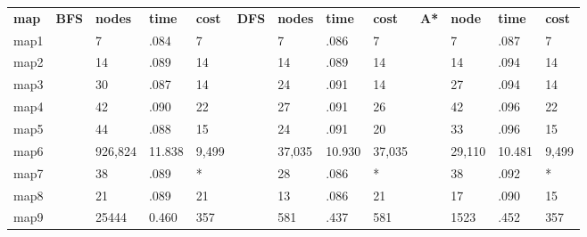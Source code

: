\documentclass[12pt]{article}
\newcommand{\n}{\vspace{5mm}}
\newenvironment{questionList}{
\newcounter{ctr}
\begin{list}{\textbf{Question \arabic{ctr}.} \\ \\ }
  {\usecounter{ctr}}
  }{
\end{list}
}
\begin{document}
\begin{questionList}
\n\noindent
\begin{table}[h]
\begin{tabular}{lllllllllllll}
\textbf{map} & \textbf{BFS} & \textbf{nodes} & \textbf{time} & \textbf{cost} & \textbf{DFS} & \textbf{nodes} & \textbf{time} & \textbf{cost} & \textbf{A*} & \textbf{node} & \textbf{time} & \textbf{cost} \\
map1         &              & 7              & .084          & 7             &              & 7              & .086          & 7             &             & 7             & .087          & 7             \\
map2         &              & 14             & .089          & 14            &              & 14             & .089          & 14            &             & 14            & .094          & 14            \\
map3         &              & 30             & .087          & 14            &              & 24             & .091          & 14            &             & 27            & .094          & 14            \\
map4         &              & 42             & .090          & 22            &              & 27             & .091          & 26            &             & 42            & .096          & 22            \\
map5         &              & 44             & .088          & 15            &              & 24             & .091          & 20            &             & 33            & .096          & 15            \\
map6         &              & 926,824        & 11.838        & 9,499         &              & 37,035         & 10.930        & 37,035        &             & 29,110        & 10.481        & 9,499         \\
map7         &              & 38             & .089          & *             &              & 28             & .086          & *             &             & 38            & .092          & *             \\
map8         &              & 21             & .089          & 21            &              & 13             & .086          & 21            &             & 17            & .090          & 15            \\
map9         &              & 25444          & 0.460         & 357           &              & 581            & .437          & 581           &             & 1523          & .452          & 357          
\end{tabular}
\end{table}



\end{questionList}
\end{document}
